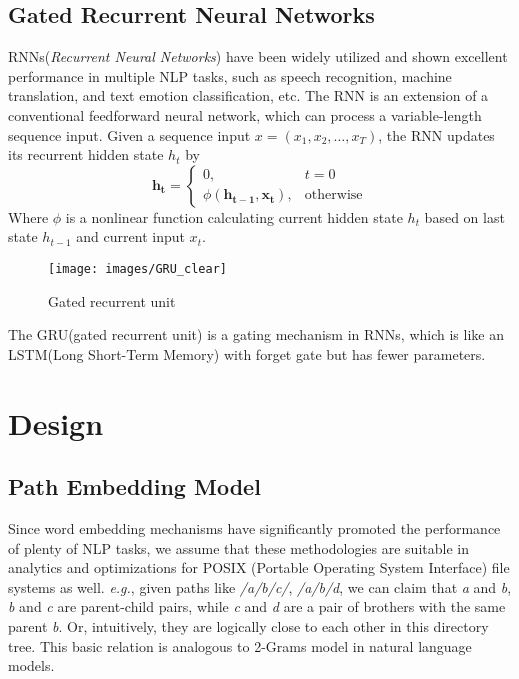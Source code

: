 \documentclass[conference]{IEEEtran}
\begin{document}
\subsection{Gated Recurrent Neural Networks}
RNNs(\textit{Recurrent Neural Networks}) have been widely utilized and shown excellent performance in multiple NLP tasks,
such as speech recognition, machine translation, and text emotion classification, etc. The RNN is an extension of a conventional feedforward neural network, which can process a variable-length sequence input. Given a sequence input $x = (x_1, x_2, \dots, x_T)$, the RNN updates its recurrent hidden state $h_t$ by
\begin{equation}
    \mathbf{h_t}=
        \begin{cases}
            0, &t=0 \\
            \phi(\mathbf{h_{t-1}, \mathbf{x_t}}), &\text{otherwise}
        \end{cases}
\end{equation}
Where $\phi$ is a nonlinear function calculating current hidden state $h_t$ based on last state $h_{t-1}$ and current input $x_t$.
\begin{figure}
\centering
\texttt{[image: images/GRU\_clear]}
\caption{Gated recurrent unit}
\end{figure}
The GRU(gated recurrent unit)\cite{GRU} is a gating mechanism in RNNs, which is like an LSTM(Long Short-Term Memory)\cite{LSTM} with forget gate but has fewer parameters.

\section{Design}
\subsection{Path Embedding Model}
Since word embedding mechanisms have significantly promoted the performance of plenty of NLP tasks, we assume that these methodologies are suitable in analytics and optimizations for POSIX (Portable Operating System Interface) file systems as well. \textit{e.g.}, given paths like \textit{/a/b/c/}, \textit{/a/b/d}, we can claim that \textit{a} and \textit{b}, \textit{b} and \textit{c} are parent-child pairs, while \textit{c} and \textit{d} are a pair of brothers with the same parent \textit{b}. Or, intuitively, they are logically close to each other in this directory tree. This basic relation is analogous to 2-Grams model in natural language models.
\end{document}
